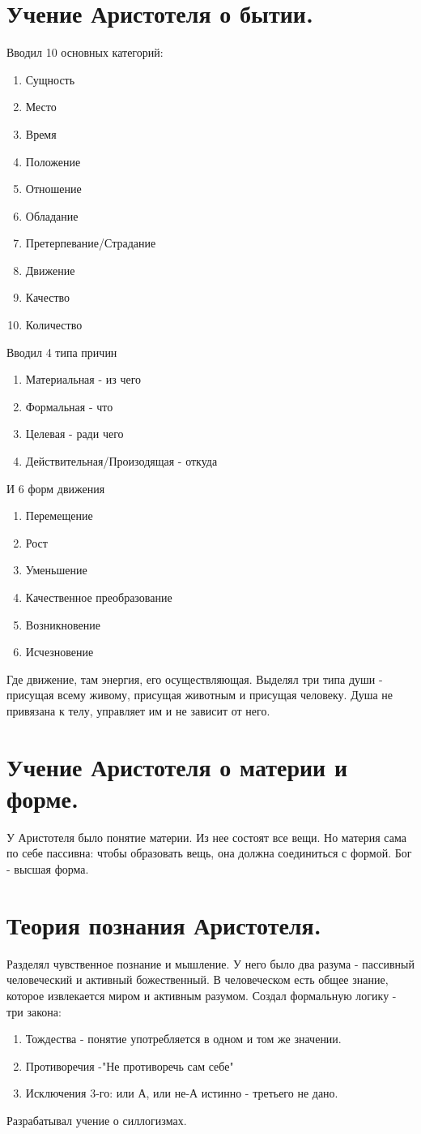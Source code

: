 \documentclass[12pt,a4paper]{article}
\begin{document}
\section{Учение Аристотеля о бытии.}
Вводил 10 основных категорий:
\begin{enumerate}
\item Сущность
\item Место
\item Время
\item Положение
\item Отношение
\item Обладание
\item Претерпевание/Страдание
\item Движение
\item Качество
\item Количество
\end{enumerate}
Вводил 4 типа причин
\begin{enumerate}
\item Материальная - из чего
\item Формальная - что
\item Целевая  - ради чего
\item Действительная/Произодящая - откуда 
\end{enumerate}
И 6 форм движения
\begin{enumerate}
\item Перемещение
\item Рост
\item Уменьшение
\item Качественное преобразование
\item Возникновение
\item Исчезновение
\end{enumerate}
Где движение, там энергия, его осуществляющая. Выделял три типа души - присущая всему живому, присущая животным и присущая человеку. Душа не привязана к телу, управляет им и не зависит от него.

\section{Учение Аристотеля о материи и форме.}
У Аристотеля было понятие материи. Из нее состоят все вещи. Но материя сама по себе пассивна: чтобы образовать вещь, она должна соединиться с формой. Бог - высшая форма.

\section{Теория познания Аристотеля.}
Разделял чувственное познание и мышление. У него было два разума - пассивный человеческий и активный божественный. 
В человеческом есть общее знание, которое извлекается миром и активным разумом. Создал формальную логику - три закона:
\begin{enumerate}
\item Тождества - понятие употребляется в одном и том же значении.
\item Противоречия -"Не противоречь сам себе"
\item Исключения 3-го: или А, или не-А истинно - третьего не дано. 
\end{enumerate}
Разрабатывал учение о силлогизмах.
\end{document}
